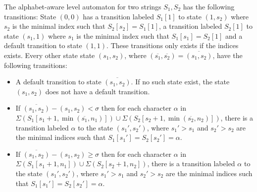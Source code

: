 \documentclass[a4paper,11pt]{article}
\begin{document}
The alphabet-aware level automaton for two strings $S_1,S_2$ has the following transitions: State $(0,0)$ has a transition labeled $S_1[1]$ to state $(1, s_2)$ where $s_2$ is the minimal index such that $S_2[s_2]=S_1[1]$, a transition labeled $S_2[1]$ to state $(s_1, 1)$ where $s_1$ is the minimal index such that $S_1[s_1]=S_2[1]$ and a default transition to state $(1,1)$.  These transitions only exists if the indices exists. Every other state state $(s_1,s_2)$, where $(\overline{s_1}, \overline{s_2})= \overline{(s_1,s_2)}$, have the following transitions:
\begin{itemize}
\item A default transition to state $\overline{(s_1,s_2)}$. If no such state exist, the state $(s_1,s_2)$ does not have a default transition.
\item If $\overline{(s_1,s_2)} - (s_1,s_2) < \sigma$ then for each character $\alpha$ in $\Sigma(S_1[s_1 + 1, \min(\overline{s_1},  n_1 )]) \cup \Sigma(S_2[s_2 + 1, \min(\overline{s_2},  n_2 )])$, there is a transition labeled $\alpha$ to the state $(s_1',s_2')$, where $s_1'>s_1$ and $s_2'>s_2$ are the minimal indices such that $S_1[s_1']= S_2[s_2']= \alpha$.
\item If $\overline{(s_1,s_2)} - (s_1,s_2) \geq \sigma$ then for each character $\alpha$ in $\Sigma(S_1[s_1 + 1,  n_1 ]) \cup \Sigma(S_2[s_2 + 1,  n_2 ])$, there is a transition labeled $\alpha$ to the state $(s_1',s_2')$, where $s_1'>s_1$ and $s_2'>s_2$ are the minimal indices such that $S_1[s_1']=S_2[s_2']= \alpha$.
\end{itemize}
\end{document}
